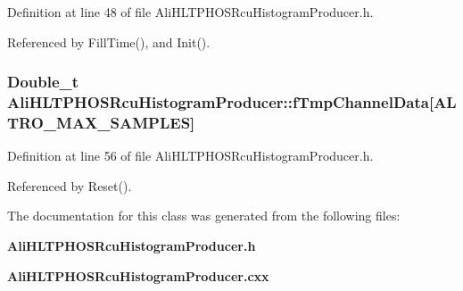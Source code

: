 Definition at line 48 of file Ali\-HLTPHOSRcu\-Histogram\-Producer.h.

Referenced by Fill\-Time(), and Init().
\subsubsection{\setlength{\rightskip}{0pt plus 5cm}Double\_\-t {\bf Ali\-HLTPHOSRcu\-Histogram\-Producer::f\-Tmp\-Channel\-Data}[ALTRO\_\-MAX\_\-SAMPLES]\hspace{0.3cm}{\tt  [private]}}\label{classAliHLTPHOSRcuHistogramProducer_r8}




Definition at line 56 of file Ali\-HLTPHOSRcu\-Histogram\-Producer.h.

Referenced by Reset().

The documentation for this class was generated from the following files:\begin{CompactItemize}
\item 
{\bf Ali\-HLTPHOSRcu\-Histogram\-Producer.h}\item 
{\bf Ali\-HLTPHOSRcu\-Histogram\-Producer.cxx}\end{CompactItemize}
